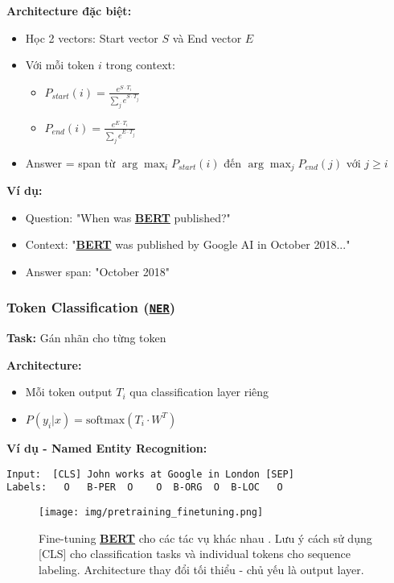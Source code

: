 \textbf{Architecture đặc biệt:}
\begin{itemize}
    \item Học 2 vectors: Start vector $S$ và End vector $E$
    \item Với mỗi token $i$ trong context:
    \begin{itemize}
        \item $P_{start}(i) = \frac{e^{S \cdot T_i}}{\sum_j e^{S \cdot T_j}}$
        \item $P_{end}(i) = \frac{e^{E \cdot T_i}}{\sum_j e^{E \cdot T_j}}$
    \end{itemize}
    \item Answer = span từ $\arg\max_i P_{start}(i)$
    đến $\arg\max_j P_{end}(j)$ với $j \geq i$
\end{itemize}

\textbf{Ví dụ:}
\begin{itemize}
    \item Question: "When was \hyperref[acro:bert]{\textbf{BERT}} published?"
    \item Context: "\hyperref[acro:bert]{\textbf{BERT}} was published by Google AI in October 2018..."
    \item Answer span: "October 2018"
\end{itemize}

\subsubsection{Token Classification (\hyperref[acro:ner]{\texttt{NER}})}
\textbf{Task:} Gán nhãn cho từng token

\textbf{Architecture:}
\begin{itemize}
    \item Mỗi token output $T_i$ qua classification layer riêng
    \item $P(y_i|x) = \text{softmax}(T_i \cdot W^T)$
\end{itemize}

\textbf{Ví dụ - Named Entity Recognition:}
\begin{verbatim}
Input:  [CLS] John works at Google in London [SEP]
Labels:   O   B-PER  O    O  B-ORG  O  B-LOC   O
\end{verbatim}

\begin{figure}[H]
    \centering
    \texttt{[image: img/pretraining\_finetuning.png]}
    \caption{Fine-tuning \hyperref[acro:bert]{\textbf{BERT}} cho các tác vụ khác
    nhau \cite{devlin2018bert}. Lưu ý cách sử dụng [CLS] cho classification tasks và individual tokens cho sequence labeling.
    Architecture thay đổi tối thiểu - chủ yếu là output layer.}
    \label{fig:bert_finetuning_tasks}
\end{figure}

